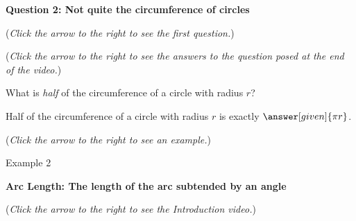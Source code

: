\documentclass{ximera}
\begin{document}
\textbf{Question 2: Not quite the circumference of circles}
\begin{question}
\begin{flushright}
{\color{blue}(\emph{Click the arrow to the right to see the first question.})}
\end{flushright}
\begin{center}
\begin{expandable}
{\color{blue}(\emph{Click the arrow to the right to see the answers 
to the question posed at the end of the video.})}
\begin{expandable}
What is \emph{half} of the circumference of a circle with radius $r$?
\begin{prompt}
Half of the circumference of a circle with radius $r$ is exactly $\answer[given]{\pi r}$.
\end{prompt}
\begin{flushright}
{\color{blue}(\emph{Click the arrow to the right to see an example.})}
\end{flushright}
\begin{expandable}
Example 2
\end{expandable}
\end{expandable}
\end{expandable}
\end{center}
\end{question}


\textbf{Arc Length: The length of the arc subtended by an angle}
\begin{explanation}
\begin{flushright}
{\color{blue}(\emph{Click the arrow to the right to see the Introduction video.})}
\end{flushright}
\begin{center}
\begin{expandable}
\end{expandable}
\end{center}
\end{explanation}
\end{document}
